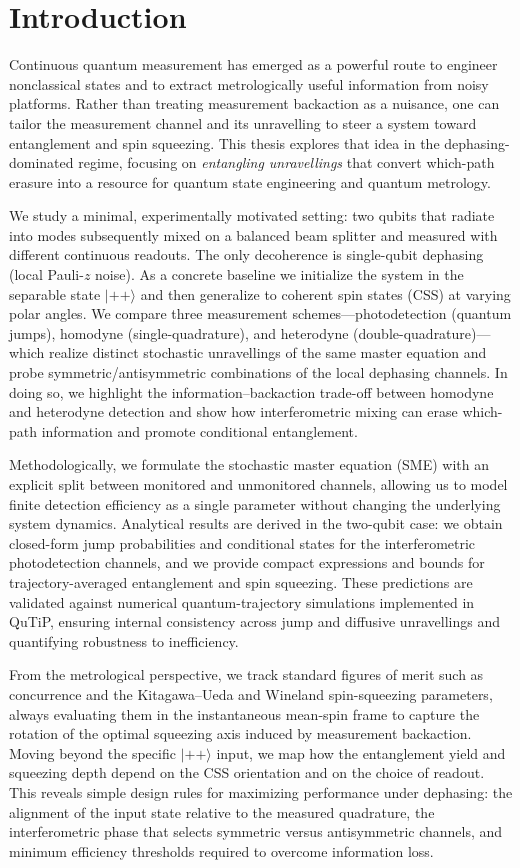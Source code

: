 \section*{Introduction}

Continuous quantum measurement has emerged as a powerful route to engineer nonclassical states and to extract metrologically useful information from noisy platforms. Rather than treating measurement backaction as a nuisance, one can tailor the measurement channel and its unravelling to steer a system toward entanglement and spin squeezing. This thesis explores that idea in the dephasing-dominated regime, focusing on \emph{entangling unravellings} that convert which-path erasure into a resource for quantum state engineering and quantum metrology.

We study a minimal, experimentally motivated setting: two qubits that radiate into modes subsequently mixed on a balanced beam splitter and measured with different continuous readouts. The only decoherence is single-qubit dephasing (local Pauli-$z$ noise). As a concrete baseline we initialize the system in the separable state \(|++\rangle\) and then generalize to coherent spin states (CSS) at varying polar angles. We compare three measurement schemes—photodetection (quantum jumps), homodyne (single-quadrature), and heterodyne (double-quadrature)—which realize distinct stochastic unravellings of the same master equation and probe symmetric/antisymmetric combinations of the local dephasing channels. In doing so, we highlight the information–backaction trade-off between homodyne and heterodyne detection and show how interferometric mixing can erase which-path information and promote conditional entanglement.

Methodologically, we formulate the stochastic master equation (SME) with an explicit split between monitored and unmonitored channels, allowing us to model finite detection efficiency as a single parameter without changing the underlying system dynamics. Analytical results are derived in the two-qubit case: we obtain closed-form jump probabilities and conditional states for the interferometric photodetection channels, and we provide compact expressions and bounds for trajectory-averaged entanglement and spin squeezing. These predictions are validated against numerical quantum-trajectory simulations implemented in \textsf{QuTiP}, ensuring internal consistency across jump and diffusive unravellings and quantifying robustness to inefficiency.

From the metrological perspective, we track standard figures of merit such as concurrence and the Kitagawa–Ueda and Wineland spin-squeezing parameters, always evaluating them in the instantaneous mean-spin frame to capture the rotation of the optimal squeezing axis induced by measurement backaction. Moving beyond the specific \(|++\rangle\) input, we map how the entanglement yield and squeezing depth depend on the CSS orientation and on the choice of readout. This reveals simple design rules for maximizing performance under dephasing: the alignment of the input state relative to the measured quadrature, the interferometric phase that selects symmetric versus antisymmetric channels, and minimum efficiency thresholds required to overcome information loss.

